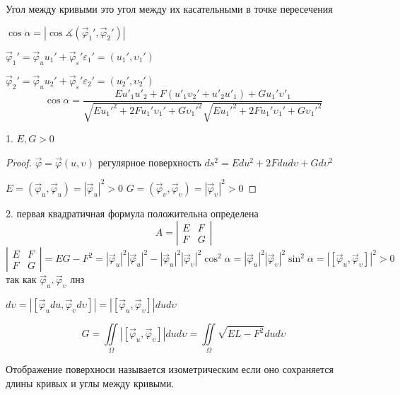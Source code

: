 Угол между кривыми это угол между их касательными в точке пересечения

$\cos \alpha = |\cos \measuredangle (\vec \varphi_1', \vec \varphi_2')|$

$\vec \varphi_1' = \vec \varphi_u u_1' + \vec \varphi_{\varepsilon}'
\varepsilon_1' = (u_1', \upsilon_1')$

$\vec \varphi_2' = \vec \varphi_u u_2' + \vec \varphi_{\varepsilon}'
\varepsilon_2' = (u_2', \upsilon_2')$
$$
\cos \alpha = \frac{Eu'_1 u'_2 + F(u'_1\upsilon_2' + u'_2 u'_1) + Gu_1'
\upsilon'_1}
{\sqrt{Eu_1'^2 + 2Fu_1'\upsilon_1' + G\upsilon_1'^2}
\sqrt{Eu_1'^2 + 2Fu_1'\upsilon_1' + G\upsilon_1'^2}}
$$

\begin{block}[Свойства]
  1. $E,G > 0$
  \begin{proof}
    $\vec \varphi = \vec \varphi (u, \upsilon)$ регулярное поверхность
    $ds^2 = Edu^2 + 2Fdud\upsilon + Gd\upsilon^2$

    $E = (\vec \varphi_u, \vec \varphi_u) = |\vec \varphi_u|^2 > 0$
    $G = (\vec \varphi_{\upsilon}, \vec \varphi_{\upsilon}) =
    |\vec \varphi_{\upsilon}|^2 > 0$
  \end{proof}

  2. первая квадратичная формула положительна определена
  $$
  A =
  \left|
  \begin{array}{cc}
    E & F \\
    F & G
  \end{array}
  \right|
  $$
  $$
  \left|
  \begin{array}{cc}
    E & F \\
    F & G
  \end{array}
  \right|
  = EG - F^2 = |\vec \varphi_u|^2|\vec \varphi_u|^2 - |\vec \varphi_u|^2
  |\vec \varphi_{\upsilon}|^2 \cos^2 \alpha = |\vec \varphi_u|^2
  |\vec \varphi_{\upsilon}|^2 \sin^2 \alpha = |[\vec \varphi_u, \vec
  \varphi_{\upsilon}]|^2 > 0
  $$
  так как $\vec \varphi_u, \vec \varphi_{\upsilon}$ лнз

  $d\upsilon = |[\vec \varphi_u du, \vec \varphi_{\upsilon} d\upsilon]| =
  |[\vec \varphi_u, \vec \varphi_{\upsilon}]| du d\upsilon$

  $$
  G = \iint \limits_{\Omega} |[\vec \varphi_u, \vec \varphi_{\upsilon}]|
  du d\upsilon = \iint \limits_{\Omega} \sqrt{EL - F^2}dud\upsilon
  $$
\end{block}

\begin{define}
  Отображение поверхноси называется изометрическим если оно сохраняется длины
  кривых и углы между кривыми.
\end{define}

